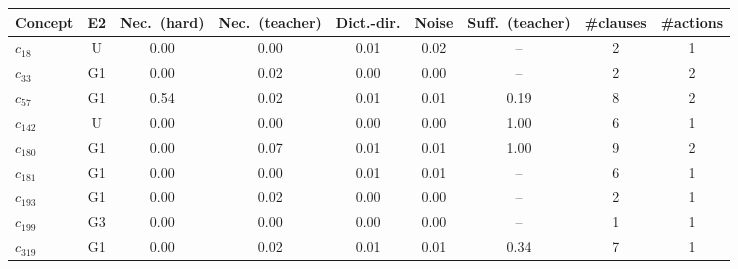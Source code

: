 \begin{tabular}{lcccccccc}
\toprule
Concept & E2 & Nec.\ (hard) & Nec.\ (teacher) & Dict.-dir. & Noise & Suff.\ (teacher) & \#clauses & \#actions \\
\midrule
$c_{18}$ & U & 0.00 & 0.00 & 0.01 & 0.02 & -- & 2 & 1 \\
$c_{33}$ & G1 & 0.00 & 0.02 & 0.00 & 0.00 & -- & 2 & 2 \\
$c_{57}$ & G1 & 0.54 & 0.02 & 0.01 & 0.01 & 0.19 & 8 & 2 \\
$c_{142}$ & U & 0.00 & 0.00 & 0.00 & 0.00 & 1.00 & 6 & 1 \\
$c_{180}$ & G1 & 0.00 & 0.07 & 0.01 & 0.01 & 1.00 & 9 & 2 \\
$c_{181}$ & G1 & 0.00 & 0.00 & 0.01 & 0.01 & -- & 6 & 1 \\
$c_{193}$ & G1 & 0.00 & 0.02 & 0.00 & 0.00 & -- & 2 & 1 \\
$c_{199}$ & G3 & 0.00 & 0.00 & 0.00 & 0.00 & -- & 1 & 1 \\
$c_{319}$ & G1 & 0.00 & 0.02 & 0.01 & 0.01 & 0.34 & 7 & 1 \\
\bottomrule
\end{tabular}